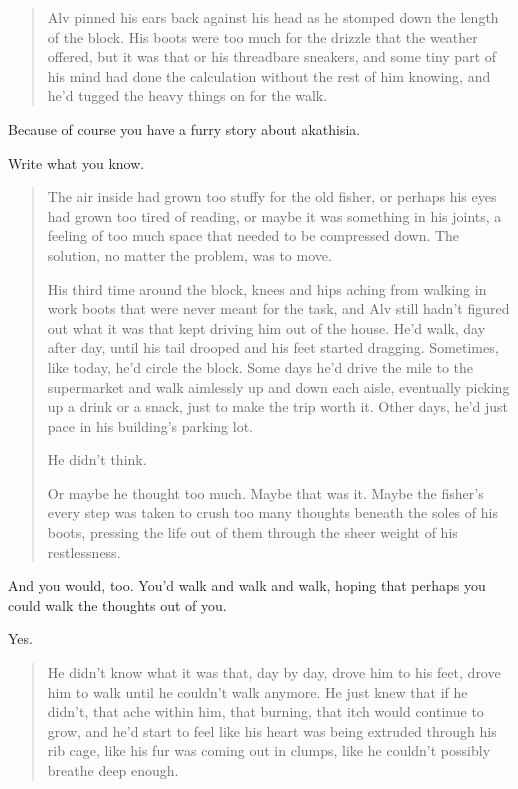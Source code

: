 \begin{paracol}{2}
\begin{leftcolumn}
\begin{quotation}
  \noindent Alv pinned his ears back against his head as he stomped down the length of the block. His boots were too much for the drizzle that the weather offered, but it was that or his threadbare sneakers, and some tiny part of his mind had done the calculation without the rest of him knowing, and he'd tugged the heavy things on for the walk.
\end{quotation}

\begin{ally}
Because of course you have a furry story about akathisia.
\end{ally}
Write what you know.

\begin{quotation}
  \noindent The air inside had grown too stuffy for the old fisher, or perhaps his eyes had grown too tired of reading, or maybe it was something in his joints, a feeling of too much space that needed to be compressed down. The solution, no matter the problem, was to move.

  His third time around the block, knees and hips aching from walking in work boots that were never meant for the task, and Alv still hadn't figured out what it was that kept driving him out of the house. He'd walk, day after day, until his tail drooped and his feet started dragging. Sometimes, like today, he'd circle the block. Some days he'd drive the mile to the supermarket and walk aimlessly up and down each aisle, eventually picking up a drink or a snack, just to make the trip worth it. Other days, he'd just pace in his building's parking lot.

  He didn't think.

  Or maybe he thought too much. Maybe that was it. Maybe the fisher's every step was taken to crush too many thoughts beneath the soles of his boots, pressing the life out of them through the sheer weight of his restlessness.
\end{quotation}

\begin{ally}
And you would, too. You'd walk and walk and walk, hoping that perhaps you could walk the thoughts out of you.
\end{ally}
Yes.

\begin{quotation}
  \noindent He didn't know what it was that, day by day, drove him to his feet, drove him to walk until he couldn't walk anymore. He just knew that if he didn't, that ache within him, that burning, that itch would continue to grow, and he'd start to feel like his heart was being extruded through his rib cage, like his fur was coming out in clumps, like he couldn't possibly breathe deep enough.


\end{quotation}
\end{leftcolumn}
\end{paracol}
